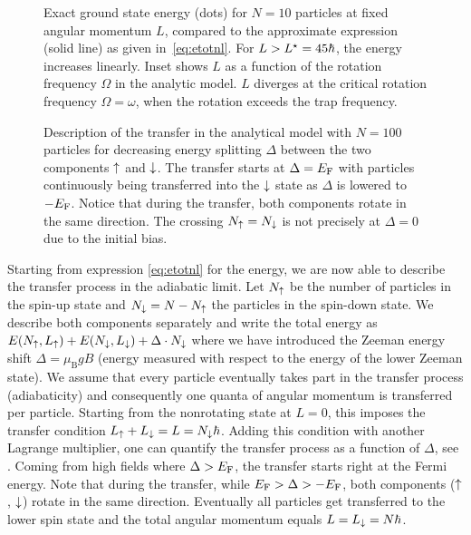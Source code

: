 
\begin{figure}[t]
    \centering
    \caption{ Exact ground state energy (dots) for $N=10$ particles at fixed angular momentum $L$, compared to the approximate expression (solid line) as given in~\eqref{eq:etotnl}. For $L>L^{\star}=45\hbar$, the energy increases linearly. Inset shows $L$ as a function of the rotation frequency $\Omega$ in the analytic model. $L$ diverges at the critical rotation frequency $\Omega=\omega$, when the rotation exceeds the trap frequency.}
\end{figure}

\begin{figure}[t]
    \centering
    \caption{Description of the transfer in the analytical model with $N=100$ particles for decreasing energy splitting $\Delta$ between the two components $\uparrow$ and $\downarrow$. The transfer starts at $\Delta=E_\text{F}$ with particles continuously being transferred into the $\downarrow$ state as $\Delta$ is lowered to $-E_\text{F}$. Notice that during the transfer, both components rotate in the same direction. The crossing $N_\uparrow=N_\downarrow$ is not precisely at $\Delta=0$ due to the initial bias.}
\end{figure}

Starting from expression \eqref{eq:etotnl} for the energy, we are now able to describe the transfer process in the adiabatic limit. Let $N_\uparrow$ be the number of particles in the spin-up state and $N_\downarrow = N-N_\uparrow$ the particles in the spin-down state. We describe both components separately and write the total energy as
$E(N_\uparrow,L_\uparrow) + E(N_\downarrow,L_\downarrow) + \Delta\cdot N_\downarrow$
where we have introduced the Zeeman energy shift $\Delta=\mu_\text{B} g B$ (energy measured with respect to the energy of the lower Zeeman state). We assume that every particle eventually takes part in the transfer process (adiabaticity) and consequently one quanta of angular momentum is transferred per particle. Starting from the nonrotating state at $L=0$, this imposes the transfer condition $L_\uparrow + L_\downarrow = L = N_\downarrow\hbar$. Adding this condition with another Lagrange multiplier, one can quantify the transfer process as a function of $\Delta$, see . Coming from high fields where $\Delta > E_\text{F}$, the transfer starts right at the Fermi energy. Note that during the transfer, while $E_\text{F} > \Delta > -E_\text{F}$, both components ($\uparrow$, $\downarrow$) rotate in the same direction. Eventually all particles get transferred to the lower spin state and the total angular momentum equals $L=L_\downarrow=N\hbar$.

